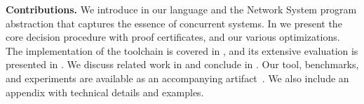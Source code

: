 \smallskip
\noindent
\textbf{Contributions.}
We introduce in   our \toolname{} language and the Network System program abstraction that captures the essence of concurrent systems.
    In  we present the core decision procedure with proof certificates, and our various optimizations.
    The implementation of the \toolname{} toolchain is covered in , and its extensive evaluation is presented in . 
%    
We discuss related work in  and conclude in .
%
Our tool, benchmarks, and experiments are available as an accompanying artifact~\cite{ArtifactRepository}.
% 
We also include an appendix with technical details and examples.